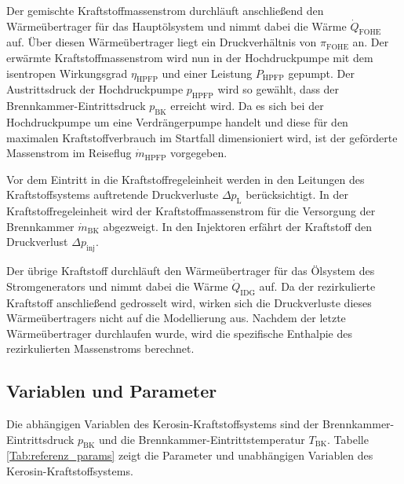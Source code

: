 Der gemischte Kraftstoffmassenstrom durchläuft anschließend den Wärmeübertrager für das Hauptölsystem und nimmt dabei die Wärme $\dot{Q}_{\mathrm{FOHE}}$ auf. Über diesen Wärmeübertrager liegt ein Druckverhältnis von $\pi_{\mathrm{FOHE}}$ an. Der erwärmte Kraftstoffmassenstrom wird nun in der Hochdruckpumpe mit dem isentropen Wirkungsgrad $\eta_{\mathrm{HPFP}}$ und einer Leistung $P_{\mathrm{HPFP}}$ gepumpt. Der Austrittsdruck der Hochdruckpumpe $p_{\mathrm{HPFP}}$ wird so gewählt, dass der Brennkammer-Eintrittsdruck $p_{\mathrm{BK}}$ erreicht wird.  Da es sich bei der Hochdruckpumpe um eine Verdrängerpumpe handelt und diese für den maximalen Kraftstoffverbrauch im Startfall dimensioniert wird, ist der geförderte Massenstrom im Reiseflug $\dot{m}_{\mathrm{HPFP}}$ vorgegeben. 

Vor dem Eintritt in die Kraftstoffregeleinheit werden in den Leitungen des Kraftstoffsystems auftretende Druckverluste $\Delta p_{\mathrm{L}}$  berücksichtigt. In der Kraftstoffregeleinheit wird der Kraftstoffmassenstrom für die Versorgung der Brennkammer $\dot{m}_{\mathrm{BK}}$ abgezweigt. In den Injektoren erfährt der Kraftstoff den Druckverlust $\Delta p_{\mathrm{inj}}$. 

Der übrige Kraftstoff durchläuft den Wärmeübertrager für das Ölsystem des Stromgenerators und nimmt dabei die Wärme $\dot{Q}_{\mathrm{IDG}}$ auf. Da der rezirkulierte Kraftstoff anschließend gedrosselt wird, wirken sich die Druckverluste dieses Wärmeübertragers nicht auf die Modellierung aus. Nachdem der letzte Wärmeübertrager durchlaufen wurde, wird die spezifische Enthalpie des rezirkulierten Massenstroms berechnet.

\subsection{Variablen und Parameter}

Die abhängigen Variablen des Kerosin-Kraftstoffsystems sind der Brennkammer-Eintrittsdruck $p_{\mathrm{BK}}$ und die Brennkammer-Eintrittstemperatur $T_{\mathrm{BK}}$. Tabelle \ref{Tab:referenz_params} zeigt die Parameter und unabhängigen Variablen des Kerosin-Kraftstoffsystems.


